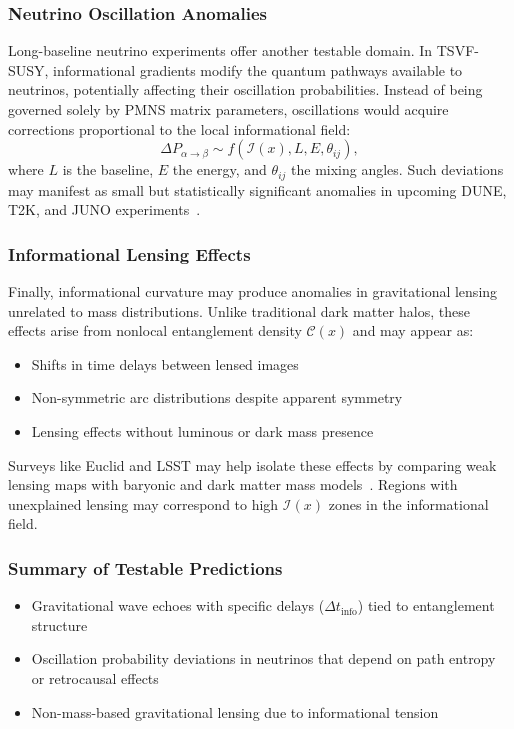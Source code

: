 \documentclass[twocolumn,superscriptaddress,floatfix]{revtex4-2}
\begin{document}
\subsubsection{Neutrino Oscillation Anomalies}

Long-baseline neutrino experiments offer another testable domain. In TSVF-SUSY, informational gradients modify the quantum pathways available to neutrinos, potentially affecting their oscillation probabilities. Instead of being governed solely by PMNS matrix parameters, oscillations would acquire corrections proportional to the local informational field:
\begin{equation}
\Delta P_{\alpha \rightarrow \beta} \sim f(\mathcal{I}(x), L, E, \theta_{ij}),
\end{equation}
where $L$ is the baseline, $E$ the energy, and $\theta_{ij}$ the mixing angles. Such deviations may manifest as small but statistically significant anomalies in upcoming DUNE, T2K, and JUNO experiments~\cite{DUNE2021, T2K2020}.

\subsubsection{Informational Lensing Effects}

Finally, informational curvature may produce anomalies in gravitational lensing unrelated to mass distributions. Unlike traditional dark matter halos, these effects arise from nonlocal entanglement density $\mathcal{C}(x)$ and may appear as:
\begin{itemize}
    \item Shifts in time delays between lensed images
    \item Non-symmetric arc distributions despite apparent symmetry
    \item Lensing effects without luminous or dark mass presence
\end{itemize}

Surveys like Euclid and LSST may help isolate these effects by comparing weak lensing maps with baryonic and dark matter mass models~\cite{LSST2009, Euclid2011}. Regions with unexplained lensing may correspond to high $\mathcal{I}(x)$ zones in the informational field.

\subsubsection{Summary of Testable Predictions}

\begin{itemize}
    \item Gravitational wave echoes with specific delays ($\Delta t_{\text{info}}$) tied to entanglement structure
    \item Oscillation probability deviations in neutrinos that depend on path entropy or retrocausal effects
    \item Non-mass-based gravitational lensing due to informational tension
\end{itemize}
\end{document}
